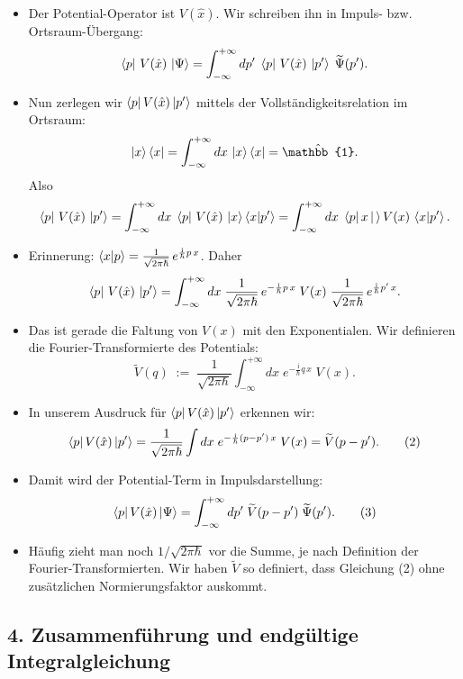 \documentclass[12pt,a4paper]{scrartcl}
\begin{document}
\begin{itemize}
  \item Der Potential-Operator ist $V(\hat x)$. Wir schreiben ihn in Impuls- bzw. Ortsraum-Übergang:
  \[
    \bra{p}\,V(\hat x)\,\ket{\Psi} 
    = \int_{-\infty}^{+\infty} dp'\;\bra{p}\,V(\hat x)\,\ket{p'}\;\widetilde\Psi(p').
  \]
  \item Nun zerlegen wir $\bra{p}V(\hat x)\ket{p'}$ mittels der Vollständigkeitsrelation im Ortsraum:
  \[
    \ket{x}\bra{x} = \int_{-\infty}^{+\infty} dx\,\ket{x}\bra{x} = \hat{\mathbb{1}}.
  \]
  Also
  \[
    \bra{p}\,V(\hat x)\,\ket{p'} 
    = \int_{-\infty}^{+\infty} dx\;\bra{p}\,V(\hat x)\,\ket{x}\bra{x}\ket{p'}
    = \int_{-\infty}^{+\infty} dx\;\bra{p}x\ket\,V(x)\,\braket{x}{p'}.
  \]
  \item Erinnerung: $\braket{x}{p} = \frac{1}{\sqrt{2\pi\hbar}}\,e^{\frac{\mathrm{i}}{\hbar} p\,x}$. Daher
  \[
    \bra{p}\,V(\hat x)\,\ket{p'}
    = \int_{-\infty}^{+\infty} dx\;\frac{1}{\sqrt{2\pi\hbar}}\,e^{-\frac{\mathrm{i}}{\hbar} p\,x}\;V(x)\;\frac{1}{\sqrt{2\pi\hbar}}\,e^{\frac{\mathrm{i}}{\hbar} p'\,x}.
  \]
  \item Das ist gerade die Faltung von $V(x)$ mit den Exponentialen. Wir definieren die Fourier-Transformierte des Potentials:
  \[
    \widetilde V(q) \;:=\; \frac{1}{\sqrt{2\pi\hbar}} \int_{-\infty}^{+\infty} dx\; e^{-\frac{\mathrm{i}}{\hbar} q\,x}\;V(x).
  \]
  \item In unserem Ausdruck für $\bra{p}V(\hat x)\ket{p'}$ erkennen wir:
  \[
    \bra{p}V(\hat x)\ket{p'}
    = \frac{1}{\sqrt{2\pi\hbar}} \int dx\; e^{-\frac{\mathrm{i}}{\hbar}(p - p')\,x} \;V(x)
    = \widetilde V(p - p').
    \tag{2}
  \]
  \item Damit wird der Potential-Term in Impulsdarstellung:
  \[
    \bra{p}V(\hat x)\ket{\Psi}
    = \int_{-\infty}^{+\infty} dp'\; \widetilde V(p - p')\;\widetilde\Psi(p').
    \tag{3}
  \]
  \item Häufig zieht man noch $1/\sqrt{2\pi\hbar}$ vor die Summe, je nach Definition der Fourier-Transformierten. Wir haben $\widetilde V$ so definiert, dass Gleichung (2) ohne zusätzlichen Normierungsfaktor auskommt.
\end{itemize}

\subsection*{4. Zusammenführung und endgültige Integralgleichung}
\end{document}

